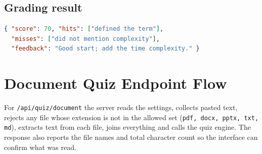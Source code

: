 \subsection{Grading result}
\begin{lstlisting}[language=JSON, caption={Response of the grading endpoint}, label={lst:grade-json}]
{ "score": 70, "hits": ["defined the term"],
  "misses": ["did not mention complexity"],
  "feedback": "Good start; add the time complexity." }
\end{lstlisting}

\section{Document Quiz Endpoint Flow}
For \texttt{/api/quiz/document} the server reads the settings, collects pasted text, rejects any file whose extension is not in the allowed set (\texttt{pdf, docx, pptx, txt, md}), extracts text from each file, joins everything and calls the quiz engine. The response also reports the file names and total character count so the interface can confirm what was read.

